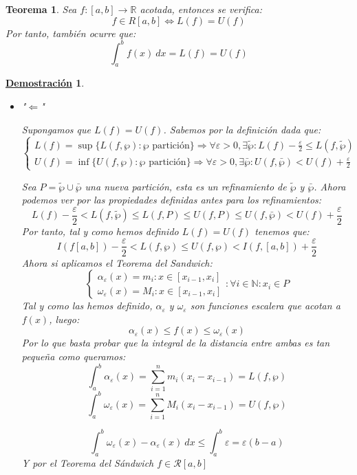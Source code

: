 \documentclass[10pt,a4paper,openright]{book}
\theoremstyle{break}
\newtheorem{theo}{Teorema}[chapter]
\newtheorem*{demo}{\underline{Demostración}}
\newcommand{\dif}[1]{\ d#1}
\begin{document}
\begin{theo}
Sea $f:[a,b]\rightarrow \mathbb R$ acotada, entonces se verifica:
$$f\in R[a,b]\Leftrightarrow L(f) = U(f)$$
Por tanto, también ocurre que:
$$\int_{a}^{b} f(x)\dif{x} = L(f) = U(f)$$
\end{theo}
\begin{demo}
\begin{itemize}
\item "$\Leftarrow$"

Supongamos que $L(f)=U(f)$. Sabemos por la definición dada que:
$$\begin{cases} L(f) = \sup\{L(f, \wp) : \wp \mbox{ partición}\} \Rightarrow\forall \varepsilon > 0, \exists \tilde{\wp} : L(f) - \frac{\varepsilon}{2} \leq L(f,\tilde{\wp}) \\ U(f) = \inf\{U(f, \wp) : \wp \mbox{ partición}\}\Rightarrow \forall \varepsilon > 0, \exists \bar{\wp}: U(f, \bar{\wp}) < U(f) +\frac{\varepsilon}{2}\end{cases}$$

Sea $P = \tilde{\wp} \cup \bar{\wp}$ una nueva partición, esta es un refinamiento de $\tilde{\wp}$ y $\bar{\wp}$. Ahora podemos ver por las propiedades definidas antes para los refinamientos:
$$L(f) - \frac{\varepsilon}{2} < L(f, \tilde{\wp}) \leq L(f,P) \leq U(f,P) \leq U(f, \bar{\wp}) < U(f) + \frac{\varepsilon}{2} $$
Por tanto, tal y como hemos definido $L(f)=U(f)$ tenemos que:
$$I(f [a,b]) - \frac{\varepsilon}{2} < L(f,\wp) \leq U(f,\wp) < I(f, [a,b]) + \frac{\varepsilon}{2}$$
Ahora si aplicamos el Teorema del Sandwich:
$$\begin{cases} \alpha_\varepsilon (x) = m_i:x\in [x_{i-1}, x_i] \\ \omega_\varepsilon (x) = M_i:x\in [x_{i-1}, x_i] \end{cases}: \forall i \in \mathbb N: x_i\in P$$
Tal y como las hemos definido, $\alpha_\varepsilon$ y $\omega_\varepsilon$ son funciones escalera que acotan a $f(x)$, luego:
$$\alpha_\varepsilon (x) \leq f(x) \leq \omega_\varepsilon (x)$$
Por lo que basta probar que la integral de la distancia entre ambas es tan pequeña como queramos:
$$\int_{a}^{b} \alpha_\varepsilon (x) = \sum_{i=1}^{n} m_i (x_i - x_{i-1}) = L(f, \wp)$$
$$\int_{a}^{b} \omega_\varepsilon (x) = \sum_{i=1}^{n} M_i (x_i - x_{i-1}) = U(f, \wp)$$

$$\int_{a}^{b} \omega_\varepsilon (x) - \alpha_\varepsilon (x)\dif{x} \leq \int_{a}^{b} \varepsilon = \varepsilon (b-a)$$
Y por el Teorema del Sándwich $f\in \mathcal{R}[a,b]$


\end{itemize}
\end{demo}
\end{document}
